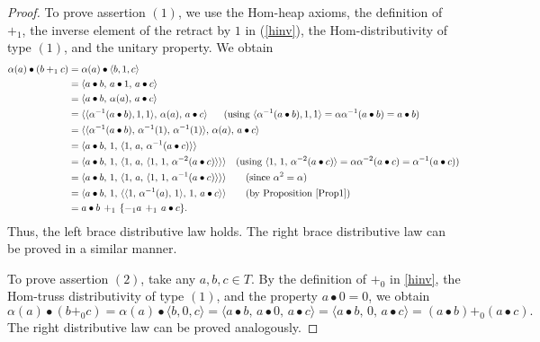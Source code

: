 \documentclass[14pt]{article}
\theoremstyle{Definition}
\theoremstyle{remark}
\begin{document}
\begin{proof}
To prove assertion $(1)$, we use the Hom-heap axioms, the definition of $+_{1}$, the inverse element of the retract by $1$ in (\ref{hinv}), the Hom-distributivity of type $(1)$, and the unitary property. We obtain
\begin{align*}
\alpha(a)\bullet(b+_{1}c) &= \alpha(a)\bullet \langle b,1,c\rangle \\
&= \langle a\bullet b,\, a\bullet 1,\, a\bullet c\rangle \\
&= \langle a\bullet b,\, \alpha(a),\, a\bullet c\rangle \\
&= \langle \langle \alpha^{-1}(a\bullet b),1,1\rangle,\, \alpha(a),\, a\bullet c\rangle~~~~~ \text{(using $\langle\alpha^{-1}(a\bullet b),1,1\rangle=\alpha\alpha^{-1}(a\bullet b)=a\bullet b$)} \\
&= \langle \langle \alpha^{-1}(a\bullet b),\, \alpha^{-1}(1),\, \alpha^{-1}(1)\rangle,\, \alpha(a),\, a\bullet c\rangle \\
&= \langle a\bullet b,\, 1,\, \langle 1,\, a,\, \alpha^{-1}(a\bullet c)\rangle\rangle \\
&= \langle a\bullet b,\, 1,\, \langle 1,\, a,\, \langle 1,\, 1,\, \alpha^{-2}(a\bullet c)\rangle\rangle\rangle~~~\text{(using $\langle 1,\, 1,\, \alpha^{-2}(a\bullet c)\rangle=\alpha\alpha^{-2}(a\bullet c)=\alpha^{-1}(a\bullet c)$)} \\
&= \langle a\bullet b,\, 1,\, \langle 1,\, a,\, \langle 1,\, 1,\, \alpha^{-1}(a\bullet c)\rangle\rangle\rangle 
\qquad \text{(since $\alpha^{2}=\alpha$)} \\
&= \langle a\bullet b,\, 1,\, \langle\langle 1,\, \alpha^{-1}(a),\, 1\rangle,\, 1,\, a\bullet c\rangle \rangle
\qquad \text{(by Proposition \ref{Prop1})} \\
&= a\bullet b \,+_{1}\,\{-_{1}a \,+_{1}\, a\bullet c\}.
\end{align*}
Thus, the left brace distributive law holds. The right brace distributive law can be proved in a similar manner. 

\smallskip

To prove assertion $(2)$, take any $a,b,c\in T$. By the definition of $+_{0}$ in \ref{hinv}, the Hom-truss distributivity of type $(1)$, and the property $a\bullet 0=0$, we obtain
\[
 \alpha(a)\bullet(b+_{0}c)
   = \alpha(a)\bullet \langle b,0,c\rangle
   = \langle a\bullet b,\, a\bullet 0,\, a\bullet c\rangle
   = \langle a\bullet b,\, 0,\, a\bullet c\rangle
   = (a\bullet b)+_{0}(a\bullet c).
\]
The right distributive law can be proved analogously.
\end{proof}
\end{document}
